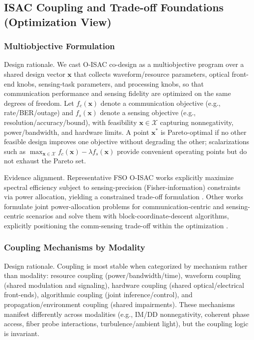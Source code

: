 \documentclass[lettersize,journal]{IEEEtran}
\begin{document}
\subsection{ISAC Coupling and Trade-off Foundations (Optimization View)}

\subsubsection{Multiobjective Formulation}
Design rationale. We cast O-ISAC co-design as a multiobjective program over a shared design vector $\mathbf{x}$ that collects waveform/resource parameters, optical front-end knobs, sensing-task parameters, and processing knobs, so that communication performance and sensing fidelity are optimized on the same degrees of freedom. Let $f_c(\mathbf{x})$ denote a communication objective (e.g., rate/BER/outage) and $f_s(\mathbf{x})$ denote a sensing objective (e.g., resolution/accuracy/bound), with feasibility $\mathbf{x}\in\mathcal{X}$ capturing nonnegativity, power/bandwidth, and hardware limits. A point $\mathbf{x}^*$ is Pareto-optimal if no other feasible design improves one objective without degrading the other; scalarizations such as $\max_{\mathbf{x}\in\mathcal{X}} f_c(\mathbf{x})-\lambda f_s(\mathbf{x})$ provide convenient operating points but do not exhaust the Pareto set.

Evidence alignment. Representative FSO O-ISAC works explicitly maximize spectral efficiency subject to sensing-precision (Fisher-information) constraints via power allocation, yielding a constrained trade-off formulation \cite{O_ISAC_048}.
Other works formulate joint power-allocation problems for communication-centric and sensing-centric scenarios and solve them with block-coordinate-descent algorithms, explicitly positioning the comm-sensing trade-off within the optimization \cite{O_ISAC_023}.

\subsubsection{Coupling Mechanisms by Modality}
Design rationale. Coupling is most stable when categorized by mechanism rather than modality: resource coupling (power/bandwidth/time), waveform coupling (shared modulation and signaling), hardware coupling (shared optical/electrical front-ends), algorithmic coupling (joint inference/control), and propagation/environment coupling (shared impairments). These mechanisms manifest differently across modalities (e.g., IM/DD nonnegativity, coherent phase access, fiber probe interactions, turbulence/ambient light), but the coupling logic is invariant.
\end{document}
